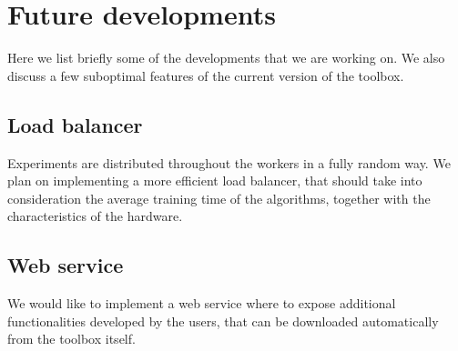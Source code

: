 \chapter{Future developments}
\label{chap:futuredevelopments}

Here we list briefly some of the developments that we are working on. We also discuss a few suboptimal features of the current version of the toolbox.

\section{Load balancer}

Experiments are distributed throughout the workers in a fully random way. We plan on implementing a more efficient load balancer, that should take into consideration the average training time of the algorithms, together with the characteristics of the hardware.

\section{Web service}

We would like to implement a web service where to expose additional functionalities developed by the users, that can be downloaded automatically from the toolbox itself.